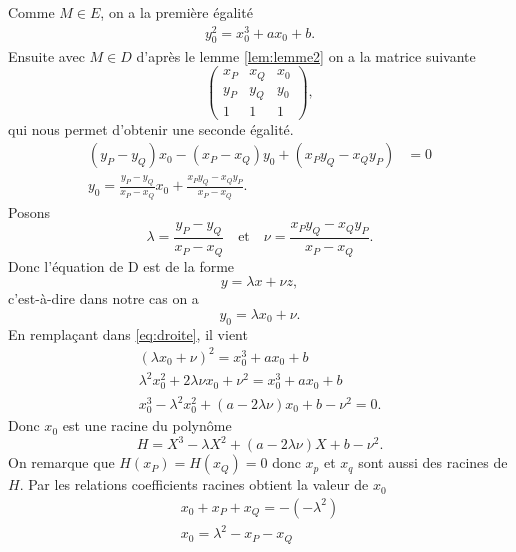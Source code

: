 \begin{demonstration}
\begin{description}
\begin{description}
            Comme $M \in E$, on a la première égalité
            \begin{align}
                \label{eq:droite} 
             y_0^2 = x_0^3 + ax_0 + b 
            .\end{align}
            Ensuite avec $M \in D$ d'après le lemme \ref{lem:lemme2}  on a la matrice suivante
            \[
                \begin{pmatrix}
                    x_P & x_Q & x_0 \\
                    y_P & y_Q & y_0  \\
                    1   & 1   & 1
                \end{pmatrix}
            ,\] 
           qui nous permet d'obtenir une seconde égalité.
           \begin{align*}
               \left( y_P - y_Q \right)x_0 - \left( x_P - x_Q \right)y_0 + \left( x_P y_Q - x_Q y_P \right) &= 0 \\
               y_0 = \frac{y_P - y_Q}{x_P - x_Q}x_0 + \frac{x_P y_Q - x_Q y_P}{x_P - x_Q}
           .\end{align*}
           Posons 
           \[
           \lambda = \frac{y_P - y_Q}{x_P - x_Q} \quad \text{et} \quad \nu = \frac{x_P y_Q - x_Q y_P}{x_P - x_Q}
           .\] 
           Donc l'équation de D est de la forme
           \[
           y = \lambda x + \nu z
           ,\] 
           c'est-à-dire dans notre cas on a
           \[
           y_0 = \lambda x_0 + \nu
           .\] 
           En remplaçant dans \eqref{eq:droite}, il vient
           \begin{align*}
               \left( \lambda x_0 + \nu  \right)^2 = x_0^3 + ax_0 + b \\
               \lambda^2 x_0^2 + 2\lambda \nu x_0 + \nu^2 = x_0^3 + ax_0 + b \\
               x_0^3 - \lambda^2 x_0^2 + \left( a - 2\lambda \nu  \right)x_0 + b - \nu^2 = 0
           .\end{align*}
           Donc $x_0$ est une racine du polynôme
            \[
           H = X^3 - \lambda X^2 + \left( a - 2\lambda\nu \right)X + b - \nu^2
           .\] 
           On remarque que $H(x_P) = H(x_Q) = 0$ donc $x_p$ et $x_q$ sont aussi des racines de $H$.
           Par les relations coefficients racines obtient la valeur de $x_0$
           \begin{align*}
               x_0 + x_P + x_Q = - \left( - \lambda^2 \right) \\
               x_0 = \lambda^2 - x_P - x_Q

\end{align*}
\end{description}
\end{description}
\end{demonstration}
